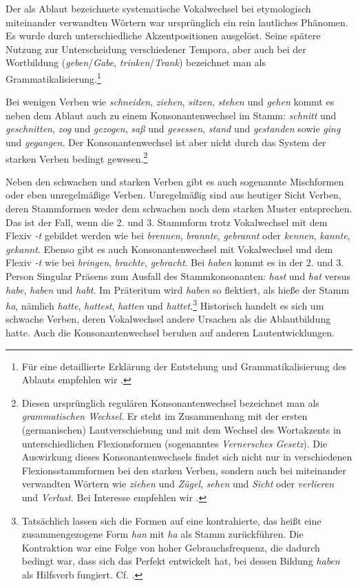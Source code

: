 Der als Ablaut bezeichnete systematische Vokalwechsel bei etymologisch miteinander verwandten Wörtern war ursprünglich ein rein lautliches Phänomen. Es wurde durch unterschiedliche Akzentpositionen ausgelöst. Seine spätere Nutzung zur Unterscheidung verschiedener Tempora, aber auch bei der Wortbildung (\textit{geben}/\textit{Gabe}, \textit{trinken}/\textit{Trank}) bezeichnet man als Grammatikalisierung.\footnote{Für eine detaillierte Erklärung der Entstehung und Grammatikalisierung des Ablauts empfehlen wir \citet[35--52]{Paul1916_68_1}.}

Bei wenigen Verben wie \textit{schneiden}, \textit{ziehen}, \textit{sitzen}, \textit{stehen} und \textit{gehen} kommt es neben dem Ablaut auch zu einem Konsonantenwechsel im Stamm: \textit{schnitt} und \textit{geschnitten}, \textit{zog} und \textit{gezogen}, \textit{saß} und \textit{gesessen}, \textit{stand} und \textit{gestanden} sowie \textit{ging} und \textit{gegangen}. Der Konsonantenwechsel ist aber nicht durch das System der starken Verben bedingt gewesen.\footnote{Diesen ursprünglich regulären Konsonantenwechsel bezeichnet man als \textit{grammatischen Wechsel}. Er steht im Zusammenhang mit der ersten (germanischen) Lautverschiebung und mit dem Wechsel des Wortakzents in unterschiedlichen Flexionsformen (sogenanntes \textit{Vernersches Gesetz}). Die Auswirkung dieses Konsonantenwechsels findet sich nicht nur in verschiedenen Flexionsstammformen bei den starken Verben, sondern auch bei miteinander verwandten Wörtern wie \textit{ziehen} und \textit{Zügel}, \textit{sehen} und \textit{Sicht} oder \textit{verlieren} und \textit{Verlust}. Bei Interesse empfehlen wir \citet[30--32]{Paul1916_68_1}.}

Neben den schwachen und starken Verben gibt es auch sogenannte Mischformen oder eben unregelmäßige Verben. Unregelmäßig sind aus heutiger Sicht Verben, deren Stammformen weder dem schwachen noch dem starken Muster entsprechen. Das ist der Fall, wenn die 2. und 3. Stammform trotz Vokalwechsel mit dem Flexiv \textit{-t} gebildet werden wie bei \textit{brennen}, \textit{brannte}, \textit{gebrannt} oder \textit{kennen}, \textit{kannte}, \textit{gekannt}. Ebenso gibt es auch Konsonantenwechsel mit Vokalwechsel und dem Flexiv \textit{-t} wie bei \textit{bringen}, \textit{brachte}, \textit{gebracht}. Bei \textit{haben} kommt es in der 2. und 3. Person Singular Präsens zum Ausfall des Stammkonsonanten: \textit{hast} und \textit{hat} versus \textit{habe}, \textit{haben} und \textit{habt}. Im Präteritum wird \textit{haben} so flektiert, als hieße der Stamm \textit{ha}, nämlich \textit{hatte}, \textit{hattest}, \textit{hatten} und \textit{hattet}.\footnote{Tatsächlich lassen sich die Formen auf eine kontrahierte, das heißt eine zusammengezogene Form \textit{han} mit \textit{ha} als Stamm zurückführen. Die Kontraktion war eine Folge von hoher Gebrauchsfrequenz, die dadurch bedingt war, dass sich das Perfekt entwickelt hat, bei dessen Bildung \textit{haben} als Hilfsverb fungiert. Cf. \citet[15--25]{Nuebling_et_al_2017}.} Historisch handelt es sich um schwache Verben, deren Vokalwechsel andere Ursachen als die Ablautbildung hatte. Auch die Konsonantenwechsel beruhen auf anderen Lautentwicklungen.

